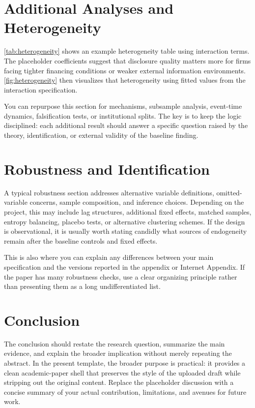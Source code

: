 \documentclass[hidelinks,12pt]{article}
\begin{document}
\section{Additional Analyses and Heterogeneity}
\label{sec:additional}

\autoref{tab:heterogeneity} shows an example heterogeneity table using interaction terms. The placeholder coefficients suggest that disclosure quality matters more for firms facing tighter financing conditions or weaker external information environments. \autoref{fig:heterogeneity} then visualizes that heterogeneity using fitted values from the interaction specification.

You can repurpose this section for mechanisms, subsample analysis, event-time dynamics, falsification tests, or institutional splits. The key is to keep the logic disciplined: each additional result should answer a specific question raised by the theory, identification, or external validity of the baseline finding.

\section{Robustness and Identification}
\label{sec:robustness}

A typical robustness section addresses alternative variable definitions, omitted-variable concerns, sample composition, and inference choices. Depending on the project, this may include lag structures, additional fixed effects, matched samples, entropy balancing, placebo tests, or alternative clustering schemes. If the design is observational, it is usually worth stating candidly what sources of endogeneity remain after the baseline controls and fixed effects.

This is also where you can explain any differences between your main specification and the versions reported in the appendix or Internet Appendix. If the paper has many robustness checks, use a clear organizing principle rather than presenting them as a long undifferentiated list.

\section{Conclusion}
\label{sec:conclusion}

The conclusion should restate the research question, summarize the main evidence, and explain the broader implication without merely repeating the abstract. In the present template, the broader purpose is practical: it provides a clean academic-paper shell that preserves the style of the uploaded draft while stripping out the original content. Replace the placeholder discussion with a concise summary of your actual contribution, limitations, and avenues for future work.
\end{document}

